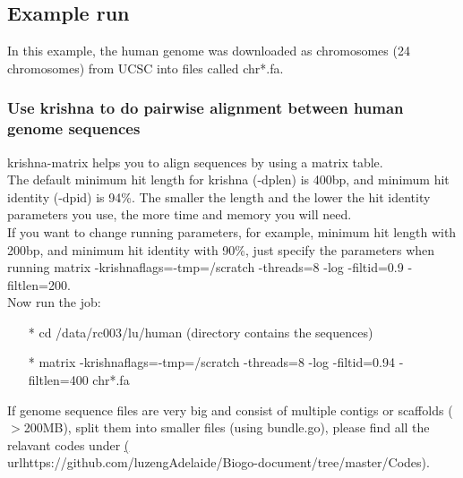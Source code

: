 \documentclass[12pt]{report}
\begin{document}

\subsection*{Example run}
In this example, the human genome was downloaded as chromosomes (24 chromosomes) from UCSC into files called chr*.fa.\\

\subsubsection{Use krishna to do pairwise alignment between human genome sequences}

krishna-matrix helps you to align sequences by using a matrix table. \\

\noindent The default minimum hit length for krishna (-dplen) is 400bp, and minimum hit identity (-dpid) is 94\%. The smaller the length and the lower the hit identity parameters you use, the more time and memory you will need. \\

\noindent If you want to change running parameters, for example, minimum hit length with 200bp, and minimum hit identity with 90\%, just specify the parameters when running matrix {\color{red}-krishnaflags=\textquotedbl-tmp=/scratch -threads=8 -log -filtid=0.9 -filtlen=200\textquotedbl}.\\

\noindent Now run the job:

\begin{enumerate}
	\item[*] cd /data/rc003/lu/human (directory contains the sequences)
	\item[*] matrix -krishnaflags=\textquotedbl-tmp=/scratch -threads=8 -log -filtid=0.94 -filtlen=400\textquotedbl{} chr*.fa
\end{enumerate}

\noindent If genome sequence files are very big and consist of multiple contigs or scaffolds ($>$200MB), split them into smaller files (using bundle.go), please find all the relavant codes under \href{<url>}(\\url{https://github.com/luzengAdelaide/Biogo-document/tree/master/Codes}).\\
\end{document}
